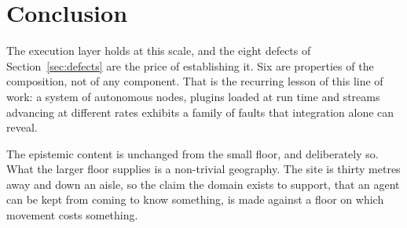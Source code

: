 \documentclass[11pt,a4paper]{article}
\theoremstyle{definition}
\begin{document}
\section{Conclusion}

The execution layer holds at this scale, and the eight defects of Section~\ref{sec:defects} are the price of establishing it. Six are properties of the composition, not of any component. That is the recurring lesson of this line of work: a system of autonomous nodes, plugins
loaded at run time and streams advancing at different rates exhibits a family of
faults that integration alone can reveal.

The epistemic content is unchanged from the small floor, and deliberately so.
What the larger floor supplies is a non-trivial geography. The site is thirty metres away and down an aisle, so the claim the domain exists to support, that an agent can be kept from coming to know something, is made against a floor on which movement costs something.
\end{document}

